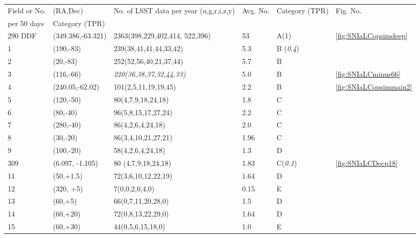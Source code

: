 
\begin{center}
\begin{table}
\begin{tabular}{|p{0.7cm} |p{2.8cm}|p{4cm}|p{1.7cm}|p{1.4cm}|p{0.7cm}|}
\hline
 Field or No. & (RA,Dec) & No. of LSST data per year (u,g,r,i,z,y)       & Avg. No.&Category (TPR) 
&Fig. No. \\
per 50 days   &Category (TPR)\\
290 DDF  & (349.386,-63.321)  & 2363(398,229,402,414, 522,396) & 53 & A(1)&\ref{fig:SNIaLCopsimdeep} 
 \\
 1      & (190,-83) &    239(38,41,41,44,33,42) & 5.3 & B ({\it 0.4}) & \\
 2      &(20,-83) & 252(52,56,40,21,37,44)  &5.7  & B  & \\
3      &(116,-66) &  {\it 220(36,38,37,32,44,33)} & 5.0 & B & \ref{fig:SNIaLCminus66} \\
 4      &(240.05,-62.02) &101(2,5,11,19,19,45) & 2.2  & B & \ref{fig:SNIaLCopsimmain2}\\
 5      &(120,-50)  &80(4,7,9,18,24,18)        & 1.8 &  C &\\
 6      & (80,-40)  &      96(5,8,15,17,27,24) &  2.2 & C &\\
 7      & (280,-40) &      86(4,2,6,4,24,18)   &  2.0& C &\\
 8      & (30,-20)  &      86(3,4,10,21,27,21) &  1.96& C & \\
 9      & (100,-20) &      58(4,2,6,4,24,18)   &  1.3& D &\\
 309  & (6.097, -1.105) & 80 (4,7,9,18,24,18)  & 1.83   & C({\it 0.1}) & \ref{fig:SNIaLCDecp18}\\
 11     & (50,+1.5) &      72(3,6,10,12,22,19) &  1.64& D &\\
 12     & (320, +5) &      7(0,0,2,0,4,0)      &  0.15& E &\\
 13     & (60,+5)   &      66(0,7,11,20,28,0)  &  1.5  & D& \\
 14     & (60,+20)  &      72(0,8,13,22,29,0)  &  1.64& D &\\
 15     & (60,+30)  &      44(0,5,6,15,18,0)   &  1.0& E &\\
\hline
\end{tabular}
\label{tab:lcpositions}
\end{table}
\end{center}




